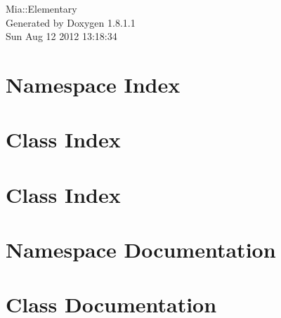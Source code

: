 \documentclass{book}
\begin{document}
\hypersetup{pageanchor=false,citecolor=blue}
\begin{titlepage}
\vspace*{7cm}
\begin{center}
{\Large Mia\-:\-:Elementary }\\
\vspace*{1cm}
{\large Generated by Doxygen 1.8.1.1}\\
\vspace*{0.5cm}
{\small Sun Aug 12 2012 13:18:34}\\
\end{center}
\end{titlepage}
\clearemptydoublepage
{}
\tableofcontents
\clearemptydoublepage
{}
\hypersetup{pageanchor=true,citecolor=blue}
\chapter{Namespace Index}

\chapter{Class Index}

\chapter{Class Index}

\chapter{Namespace Documentation}







\chapter{Class Documentation}




























\printindex
\end{document}

